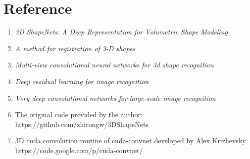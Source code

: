 \documentclass[11pt,journal,compsoc]{IEEEtran}
\begin{document}
  \section*{Reference}
  \begin{enumerate}
    \item \textit{3D ShapeNets: A Deep Representation for Volumetric Shape Modeling}
    \item \textit{A method for registration of 3-D shapes}
    \item \textit{Multi-view
    convolutional neural networks for 3d shape recognition}
    \item \textit{Deep residual learning for image
    recognition}
    \item \textit{Very deep convolutional networks for
    large-scale image recognition}
    \item The original code provided by the author:
    https://github.com/zhirongw/3DShapeNets
    \item 3D cuda convolution routine of cuda-convnet developed by Alex Krizhevsky 
    https://code.google.com/p/cuda-convnet/
  \end{enumerate}
   
  \ifCLASSOPTIONcaptionsoff
    \newpage
  \fi
\end{document}
